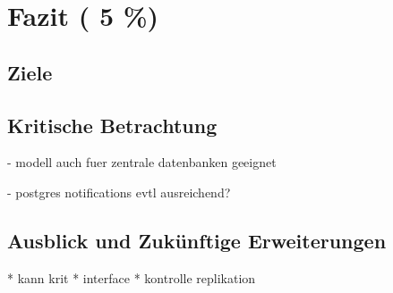 \chapter{Fazit ( 5 \%)}
\section{Ziele}


\section{Kritische Betrachtung}


- modell auch fuer zentrale datenbanken geeignet

- postgres notifications evtl ausreichend?




\section{Ausblick und Zukünftige Erweiterungen}

* kann krit
* interface
* kontrolle replikation

